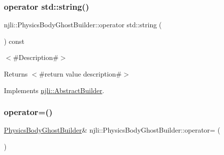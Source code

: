 \subsubsection{\texorpdfstring{operator std\+::string()}{operator std::string()}}
{\footnotesize\ttfamily njli\+::\+Physics\+Body\+Ghost\+Builder\+::operator std\+::string (\begin{DoxyParamCaption}{ }\end{DoxyParamCaption}) const\hspace{0.3cm}{\ttfamily [virtual]}}

$<$\#\+Description\#$>$

\begin{DoxyReturn}{Returns}
$<$\#return value description\#$>$ 
\end{DoxyReturn}


Implements \mbox{\hyperlink{classnjli_1_1_abstract_builder_a3e6e553e06d1ca30517ad5fb0bd4d000}{njli\+::\+Abstract\+Builder}}.

\mbox{\label{classnjli_1_1_physics_body_ghost_builder_a8f711c771c4b12e5c78a2da5dfae0b15}} 
\subsubsection{\texorpdfstring{operator=()}{operator=()}}
{\footnotesize\ttfamily \mbox{\hyperlink{classnjli_1_1_physics_body_ghost_builder}{Physics\+Body\+Ghost\+Builder}}\& njli\+::\+Physics\+Body\+Ghost\+Builder\+::operator= (\begin{DoxyParamCaption}\item[{const \mbox{\hyperlink{classnjli_1_1_physics_body_ghost_builder}{Physics\+Body\+Ghost\+Builder}} \&}]{ }\end{DoxyParamCaption})\hspace{0.3cm}{\ttfamily [protected]}}

\mbox{\label{classnjli_1_1_physics_body_ghost_builder_a45017515b351bc6900ebf4f5875ee93e}} 
